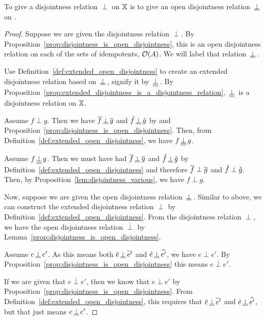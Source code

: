 \begin{theorem}\label{thm:open_disjointness_is_disjointness}
   To give a disjointness relation $\perp$ on $\mathbb{X}$ is to give an open disjointness relation
   $\,\underline{\perp}\,$ on \X.
\end{theorem}
\begin{proof}
  Suppose we are given the disjointness relation $\perp$. By
  Proposition~\ref{prop:disjointness_is_open_disjointness}, this is an open disjointness relation
  on each of the sets of idempotents, $\mathcal{O}({A})$. We will label that relation $\,\underline{\perp}\,$.

  Use Definition~\ref{def:extended_open_disjointness} to create an extended
  disjointness relation based on $\,\underline{\perp}\,$, signify it by $\,\underline{\underline{\perp}}\,$.
  By Proposition~\ref{prop:extended_disjointness_is_a_disjointness_relation}, $\,\underline{\underline{\perp}}\,$ is
  a disjointness relation on $\mathbb{X}$.

  Assume $f\perp g$. Then we have $\overline{f}\,\underline{\perp}\,\overline{g}$ and $\hat{f}\,\underline{\perp}\,\hat{g}$ by
   and Proposition~\ref{prop:disjointness_is_open_disjointness}. Then, from
  Definition~\ref{def:extended_open_disjointness}, we have $f \,\underline{\underline{\perp}}\, g$.

  Assume $f \,\underline{\underline{\perp}}\, g$. Then we must have had $\overline{f}\,\underline{\perp}\,\overline{g}$ and $\hat{f}\,\underline{\perp}\,\hat{g}$
  by Definition~\ref{def:extended_open_disjointness} and therefore $\overline{f}\perp\overline{g}$ and
  $\hat{f}\perp\hat{g}$. Then, by Proposition~\ref{lem:disjointness_various}, we have $f \perp g$.


  Now, suppose we are given the open disjointness relation $\,\underline{\perp}\,$. Similar to above, we can
  construct the extended disjointness relation $\perp$ by
  Definition~\ref{def:extended_open_disjointness}. From the disjointness relation $\perp$, we have
  the open disjointness relation $\overline{\perp}$ by
  Lemma~\ref{prop:disjointness_is_open_disjointness}.

  Assume $e \,\underline{\perp}\, e'$. As this means both $\overline{e} \,\underline{\perp}\, \overline{e'}$ and
  $\hat{e} \,\underline{\perp}\, \widehat{e'}$, we have $e \perp e'$. By
  Proposition~\ref{prop:disjointness_is_open_disjointness} this means $e \overline{\perp} e'$.

  If we are given that $e \overline{\perp} e'$, then we know that $e \perp e'$ by
  Proposition~\ref{prop:disjointness_is_open_disjointness}. From
  Definition~\ref{def:extended_open_disjointness}, this requires that $\overline{e} \,\underline{\perp}\, \overline{e'}$
  and $\hat{e} \,\underline{\perp}\, \widehat{e'}$, but that just means $e \,\underline{\perp}\, e'$.
\end{proof}

